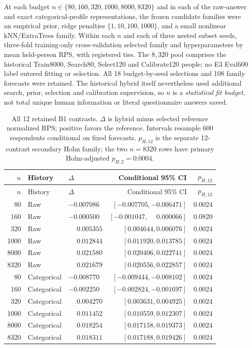 \documentclass[10pt]{article}
\begin{document}
At each budget $n\in\{80,160,320,1000,8000,8320\}$ and in each of the
raw-answer and exact categorical-profile representations, the frozen
candidate families were an empirical prior, ridge penalties
$\{1,10,100,1000\}$, and a small nonlinear kNN/ExtraTrees family. Within
each $n$ and each of three nested subset seeds, three-fold training-only
cross-validation selected family and hyperparameters by mean held-person
RPS, with registered ties. The $8,320$ pool comprises the historical
Train8000, Search80, Select120 and Calibrate120 people; no E3 Eval600 label
entered fitting or selection. All 18 budget-by-seed selections and 108
family forecasts were retained. The historical hybrid itself nevertheless
used additional search, prior, selection and calibration supervision, so
$n$ is a \emph{statistical fit budget}, not total unique human information
or literal questionnaire answers saved.

\begin{longtable}{@{}rllrr@{}}
\caption{All 12 retained B1 contrasts. $\Delta$ is hybrid minus selected
reference normalized RPS; positive favors the reference. Intervals resample
600 respondents conditional on fixed forecasts. $p_{H,12}$ is the separate
12-contrast secondary Holm family; the two $n=8320$ rows have primary
Holm-adjusted $p_{H,2}=0.0004$.}\label{tab:b1}\\
\toprule
$n$ & History & $\Delta$ & Conditional 95\% CI & $p_{H,12}$\\
\midrule\endfirsthead
\toprule $n$ & History & $\Delta$ & Conditional 95\% CI & $p_{H,12}$\\
\midrule\endhead
80   & Raw         & $-0.007086$ & $[-0.007705,-0.006471]$ & 0.0024\\
160  & Raw         & $-0.000500$ & $[-0.001047,\phantom{-}0.000066]$ & 0.0820\\
320  & Raw         & $\phantom{-}0.005355$ & $[0.004644,0.006076]$ & 0.0024\\
1000 & Raw         & $\phantom{-}0.012844$ & $[0.011920,0.013785]$ & 0.0024\\
8000 & Raw         & $\phantom{-}0.021580$ & $[0.020406,0.022741]$ & 0.0024\\
8320 & Raw         & $\phantom{-}0.021679$ & $[0.020556,0.022857]$ & 0.0024\\
80   & Categorical & $-0.008770$ & $[-0.009444,-0.008102]$ & 0.0024\\
160  & Categorical & $-0.002250$ & $[-0.002824,-0.001697]$ & 0.0024\\
320  & Categorical & $\phantom{-}0.004270$ & $[0.003631,0.004925]$ & 0.0024\\
1000 & Categorical & $\phantom{-}0.011452$ & $[0.010559,0.012307]$ & 0.0024\\
8000 & Categorical & $\phantom{-}0.018254$ & $[0.017158,0.019373]$ & 0.0024\\
8320 & Categorical & $\phantom{-}0.018311$ & $[0.017188,0.019426]$ & 0.0024\\
\bottomrule
\end{longtable}
\end{document}

